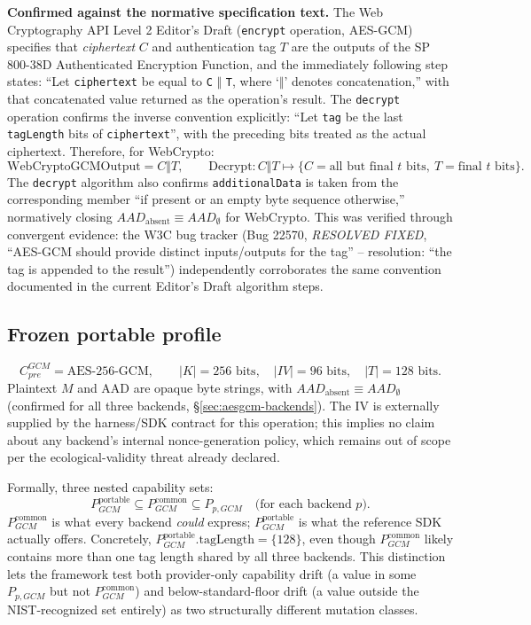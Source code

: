 \documentclass[11pt,a4paper]{article}
\begin{document}
\textbf{Confirmed against the normative specification text.} The Web Cryptography API Level 2 Editor's Draft (\texttt{encrypt} operation, AES-GCM) specifies that \emph{ciphertext} $C$ and authentication tag $T$ are the outputs of the SP 800-38D Authenticated Encryption Function, and the immediately following step states: ``Let \texttt{ciphertext} be equal to \texttt{C} $\Vert$ \texttt{T}, where `$\Vert$' denotes concatenation,'' with that concatenated value returned as the operation's result. The \texttt{decrypt} operation confirms the inverse convention explicitly: ``Let \texttt{tag} be the last \texttt{tagLength} bits of \texttt{ciphertext}'', with the preceding bits treated as the actual ciphertext. Therefore, for WebCrypto:
\[\text{WebCryptoGCMOutput} = C \Vert T, \qquad \text{Decrypt}: C\Vert T \mapsto \{C = \text{all but final } t \text{ bits},\ T = \text{final } t \text{ bits}\}.\]
The \texttt{decrypt} algorithm also confirms \texttt{additionalData} is taken from the corresponding member ``if present or an empty byte sequence otherwise,'' normatively closing $AAD_{\text{absent}}\equiv AAD_{\emptyset}$ for WebCrypto. This was verified through convergent evidence: the W3C bug tracker (Bug 22570, \emph{RESOLVED FIXED}, ``AES-GCM should provide distinct inputs/outputs for the tag'' -- resolution: ``the tag is appended to the result'') independently corroborates the same convention documented in the current Editor's Draft algorithm steps.

\subsection{Frozen portable profile}
\[C_{pre}^{GCM} = \text{AES-256-GCM}, \qquad |K|=256 \text{ bits}, \quad |IV|=96 \text{ bits}, \quad |T|=128 \text{ bits}.\]
Plaintext $M$ and AAD are opaque byte strings, with $AAD_{\text{absent}} \equiv AAD_{\emptyset}$ (confirmed for all three backends, \S\ref{sec:aesgcm-backends}). The IV is externally supplied by the harness/SDK contract for this operation; this implies no claim about any backend's internal nonce-generation policy, which remains out of scope per the ecological-validity threat already declared.

Formally, three nested capability sets:
\[P_{GCM}^{\text{portable}} \subseteq P_{GCM}^{\text{common}} \subseteq P_{p,GCM} \quad \text{(for each backend $p$)}.\]
$P_{GCM}^{\text{common}}$ is what every backend \emph{could} express; $P_{GCM}^{\text{portable}}$ is what the reference SDK actually offers. Concretely, $P_{GCM}^{\text{portable}}.\text{tagLength} = \{128\}$, even though $P_{GCM}^{\text{common}}$ likely contains more than one tag length shared by all three backends. This distinction lets the framework test both provider-only capability drift (a value in some $P_{p,GCM}$ but not $P_{GCM}^{\text{common}}$) and below-standard-floor drift (a value outside the NIST-recognized set entirely) as two structurally different mutation classes.
\end{document}
